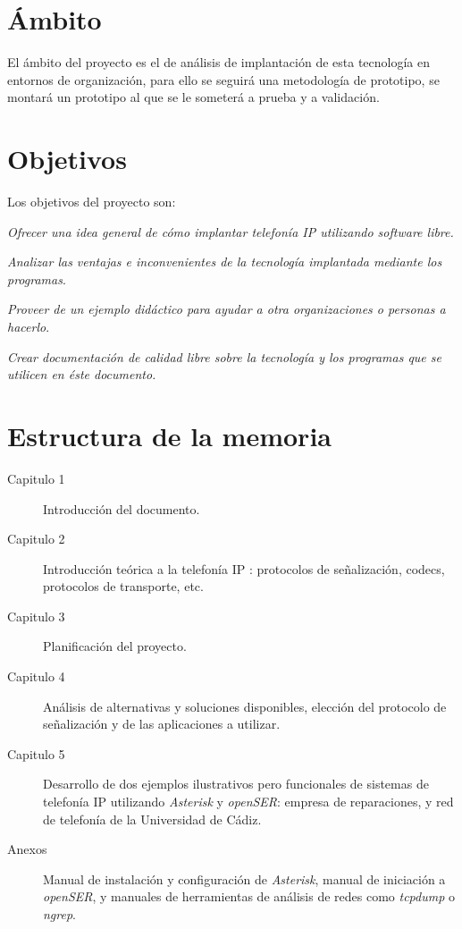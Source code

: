\documentclass{scrartcl}
\begin{document}
\section{Ámbito}

El ámbito del proyecto es el de análisis de implantación de esta tecnología en entornos de organización, para ello se seguirá una metodología de prototipo, se montará un prototipo al que se le someterá a prueba y a validación. 

\section{Objetivos}

Los objetivos del proyecto son:

\begin{list}{-}{}

\item \emph{Ofrecer una idea general de cómo implantar telefonía IP utilizando software libre.}
\item \emph{Analizar las ventajas e inconvenientes de la tecnología implantada mediante los programas}.
\item \emph{Proveer de un ejemplo didáctico para ayudar a otra organizaciones o personas a hacerlo}.
\item \emph{Crear documentación de calidad libre sobre la tecnología y los programas que se utilicen en éste documento.}

\end{list}
\section{Estructura de la memoria}

\begin{description}
\item[Capitulo 1]Introducción del documento.  
\item[Capitulo 2]Introducción teórica a la telefonía IP : protocolos de señalización, codecs, protocolos de transporte, etc.
\item[Capitulo 3]Planificación del proyecto.
\item[Capitulo 4]Análisis de alternativas y soluciones disponibles, elección del protocolo de señalización y de las aplicaciones a utilizar.
\item[Capitulo 5]Desarrollo de dos ejemplos ilustrativos pero funcionales de sistemas de telefonía IP utilizando \emph{Asterisk} y \emph{openSER}: empresa de reparaciones, y red de telefonía de la Universidad de Cádiz. 

\item[Anexos]Manual de instalación y configuración de \emph{Asterisk}, manual de iniciación a \emph{openSER}, y manuales de herramientas de análisis de redes como \emph{tcpdump} o \emph{ngrep}.
\end{description}
\end{document}
